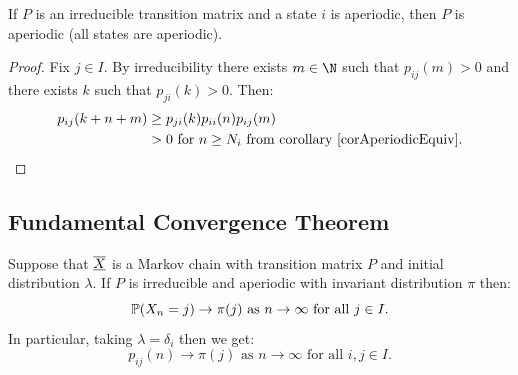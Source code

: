 \documentclass[../Main.tex]{subfiles}
\begin{document}
\begin{lemma}
    If $P$ is an irreducible transition matrix and a state $i$ is aperiodic, then $P$ is aperiodic (all states are aperiodic).
    \label{lemOneAperiodicAllAperiodic}
\end{lemma}
\begin{proof}
    Fix $j \in I$. By irreducibility there exists $m \in \N$ such that $p_{ij}(m) > 0$  and there exists $k$ such that $p_{ji}(k) > 0$. Then:
    \begin{align*}
        p_{ij}(k + n + m) &\geq p_{ji}(k) p_{ii}(n) p_{ij}(m) \\
        &> 0 \text{ for $n \geq N_i$ from corollary~\ref{corAperiodicEquiv}.}        
    \end{align*}
\end{proof}
\subsection{Fundamental Convergence Theorem}
\begin{theorem}
    Suppose that $\chain{X}$ is a Markov chain with transition matrix $P$ and initial distribution $\lambda$. If $P$ is irreducible and aperiodic with invariant distribution $\pi$ then:
    \begin{equation*}
        \P(X_n = j) \to \pi(j) \text{ as $n \to \infty$ for all $j \in I$.}
    \end{equation*}
    In particular, taking $\lambda = \delta_i$ then we get:
    \begin{equation*}
        p_{ij}(n) \to \pi(j) \text{ as $n \to \infty$ for all $i, j \in I$.}
    \end{equation*}
    \label{thmFundamentalConvergence}
\end{theorem}
\end{document}
